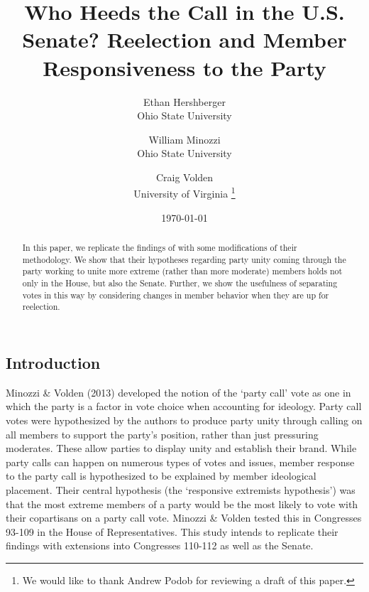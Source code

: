 \documentclass[12pt]{article}
\begin{document}
	\title{Who Heeds the Call in the U.S. Senate? Reelection and Member Responsiveness to the Party}
	
	\author{Ethan Hershberger\\Ohio State University \and William Minozzi\\Ohio State University \and Craig Volden\\University of Virginia \thanks{We would like to thank Andrew Podob for reviewing a draft of this paper.}}
	
	\date{\today}

\maketitle
\begin{abstract}
	\singlespacing
	\noindent
	In this paper, we replicate the findings of \cite{Minozzi:2013} with some modifications of their methodology. We show that their hypotheses regarding party unity coming through the party working to unite more extreme (rather than more moderate) members holds not only in the House, but also the Senate. Further, we show the usefulness of separating votes in this way by considering changes in member behavior when they are up for reelection.
\end{abstract}

\pagebreak

\doublespacing


\subsection*{Introduction}

Minozzi \& Volden (2013) developed the notion of the `party call' vote as one in which the party is a factor in vote choice when accounting for ideology. Party call votes were hypothesized by the authors to produce party unity through calling on all members to support the party's position, rather than just pressuring moderates. These allow parties to display unity and establish their brand. While party calls can happen on numerous types of votes and issues, member response to the party call is hypothesized to be explained by member ideological placement. Their central hypothesis (the `responsive extremists hypothesis') was that the most extreme members of a party would be the most likely to vote with their copartisans on a party call vote. Minozzi \& Volden tested this in Congresses 93-109 in the House of Representatives. This study intends to replicate their findings with extensions into Congresses 110-112 as well as the Senate.
\end{document}
